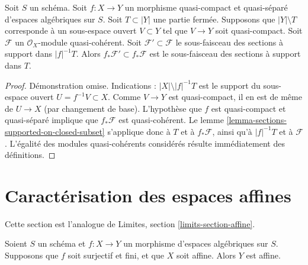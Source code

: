 \begin{lemma}
\label{lemma-push-sections-supported-on-closed-subset}
Soit $S$ un schéma.
Soit $f : X \to Y$ un morphisme quasi-compact et quasi-séparé
d'espaces algébriques sur $S$. Soit $T \subset |Y|$ une partie fermée.
Supposons que $|Y| \setminus T$ corresponde à un sous-espace ouvert $V \subset Y$
tel que $V \to Y$ soit quasi-compact. Soit $\mathcal{F}$ un
$\mathcal{O}_X$-module quasi-cohérent. Soit $\mathcal{F}' \subset \mathcal{F}$
le sous-faisceau des sections à support dans $|f|^{-1}T$.
Alors $f_*\mathcal{F}' \subset f_*\mathcal{F}$ est le sous-faisceau
des sections à support dans $T$.
\end{lemma}

\begin{proof}
Démonstration omise. Indications : $|X| \setminus |f|^{-1}T$ est le support du sous-espace ouvert
$U = f^{-1}V \subset X$. Comme $V \to Y$ est quasi-compact, il en est de même de
$U \to X$ (par changement de base). L'hypothèse que $f$ est quasi-compact et
quasi-séparé implique que $f_*\mathcal{F}$ est quasi-cohérent.
Le lemme \ref{lemma-sections-supported-on-closed-subset}
s'applique donc à $T$ et à $f_*\mathcal{F}$, ainsi qu'à
$|f|^{-1}T$ et à $\mathcal{F}$. L'égalité des modules quasi-cohérents considérés
résulte immédiatement des définitions.
\end{proof}















\section{Caractérisation des espaces affines}
\label{section-affine}

\noindent
Cette section est l'analogue de Limites, section \ref{limits-section-affine}.

\begin{lemma}
\label{lemma-affine}
Soient $S$ un schéma et $f : X \to Y$ un morphisme d'espaces algébriques
sur $S$. Supposons que $f$ soit surjectif et fini, et que $X$
soit affine. Alors $Y$ est affine.
\end{lemma}


